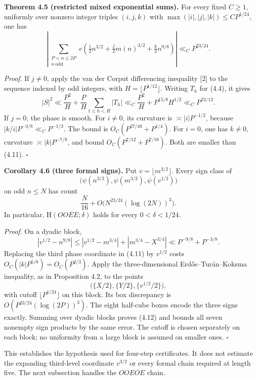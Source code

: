 \documentclass[11pt,a4paper]{article}
\begin{document}

\textbf{Theorem 4.5 (restricted mixed exponential sums).} For every
fixed \(C\ge1\), uniformly over nonzero integer triples \((i,j,k)\) with
\(\max(|i|,|j|,|k|)\le CP^{1/24}\), one has \[
\left|\sum_{\substack{P<n\le2P\\n\ \mathrm{odd}}}
e\left(\tfrac i2 n^{3/2}+\tfrac j2m(n)^{3/2}
+\tfrac k2n^{9/8}\right)\right|\ll_C P^{23/24}.
\tag{4.11}
\]

\emph{Proof.} If \(j\ne0\), apply the van der Corput differencing
inequality {[}2{]} to the sequence indexed by odd integers, with
\(H=\lfloor P^{1/12}\rfloor\). Writing \(T_h\) for (4.4), it gives \[
|S|^2\ll \frac{P^2}{H}+\frac P H\sum_{1\le h<H}|T_h|
\ll_C \frac{P^2}H+P^{15/8}H^{1/2}
\ll_C P^{23/12}.
\] If \(j=0\), the phase is smooth. For \(i\ne0\), its curvature is
\(\asymp |i|P^{-1/2}\), because \(|k/i|P^{-3/8}\ll_C P^{-1/3}\). The
bound is \(O_C(P^{37/48}+P^{1/4})\). For \(i=0\), one has \(k\ne0\),
curvature \(\asymp |k|P^{-7/8}\), and bound \(O_C(P^{7/12}+P^{7/16})\).
Both are smaller than (4.11). \(\square\)


\textbf{Corollary 4.6 (three formal signs).} Put
\(v=\lfloor m^{3/2}\rfloor\). Every sign class of \[
\bigl(\psi(n^{3/2}),\psi(m^{3/2}),\psi(v^{1/2})\bigr)
\] on odd \(n\le N\) has count \[
\frac N{16}+O\bigl(N^{23/24}(\log(2N))^3\bigr).
\tag{4.12}
\] In particular, \(\mathrm H(OOEE;\delta)\) holds for every
\(0<\delta<1/24\).

\emph{Proof.} On a dyadic block, \[
|v^{1/2}-n^{9/8}|
\le |v^{1/2}-m^{3/4}|+|m^{3/4}-X^{3/4}|
\ll P^{-9/8}+P^{-3/8}.
\] Replacing the third phase coordinate in (4.11) by \(v^{1/2}\) costs
\(O_C(|k|P^{5/8})=O_C(P^{2/3})\). Apply the three-dimensional
Erd\H{o}s--Tur\'{a}n--Koksma inequality, as in Proposition 4.2, to the
points \[
\bigl(\{X/2\},\{Y/2\},\{v^{1/2}/2\}\bigr),
\] with cutoff \(\lfloor P^{1/24}\rfloor\) on this block. Its box
discrepancy is \(O(P^{23/24}(\log(2P))^3)\). The eight half-cube boxes
encode the three signs exactly. Summing over dyadic blocks proves (4.12)
and bounds all seven nonempty sign products by the same error. The
cutoff is chosen separately on each block; no uniformity from a large
block is assumed on smaller ones. \(\square\)

This establishes the hypothesis used for four-step certificates. It does
not estimate the expanding third-level coordinate \(v^{3/2}\) or every
formal chain required at length five. The next subsection handles the
\(OOEOE\) chain.
\end{document}
